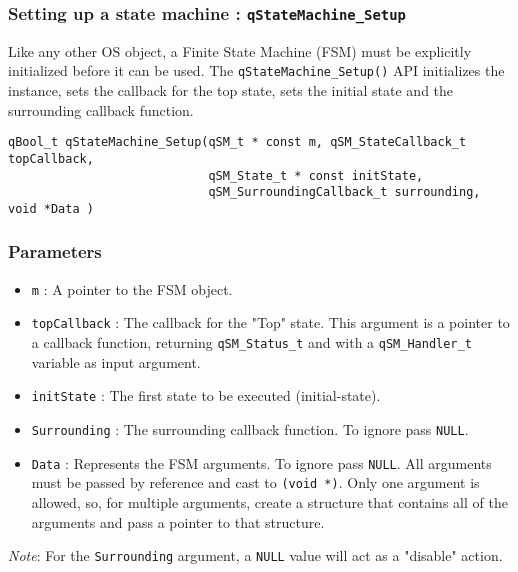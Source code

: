 \subsubsection{Setting up a state machine : \texorpdfstring{\lstinline{qStateMachine_Setup}}{qStateMachine_Setup} }
Like any other OS object, a Finite State Machine (FSM) must be explicitly initialized before it can be used. The \lstinline{qStateMachine_Setup()} API   initializes the instance, sets the callback for the top state, sets the initial state and the surrounding callback function.
\medskip

\begin{lstlisting}[style=CStyle]
qBool_t qStateMachine_Setup(qSM_t * const m, qSM_StateCallback_t topCallback, 
                            qSM_State_t * const initState, 
                            qSM_SurroundingCallback_t surrounding, void *Data )
\end{lstlisting}

\subsubsection*{Parameters}
\begin{itemize}
    \item \lstinline{m} : A pointer to the FSM object.
    \item \lstinline{topCallback} :  The callback for the "Top" state. This argument is a pointer to a callback function, returning \lstinline{qSM_Status_t} and with a \lstinline{qSM_Handler_t} variable as input argument.
    \item \lstinline{initState} : The first state to be executed (initial-state). 
    \item \lstinline{Surrounding} : The surrounding callback function. To ignore pass \lstinline{NULL}.
    \item \lstinline{Data} : Represents the FSM arguments. To ignore pass \lstinline{NULL}. All arguments must be passed by reference and cast to \lstinline{(void *)}. Only one argument is allowed, so, for multiple arguments, create a structure that contains all of the arguments and pass a pointer to that structure. 
\end{itemize}  

\begin{tcolorbox}
\ArrowBoldDownRight \textit{Note}: For the \lstinline{Surrounding} argument, a \lstinline{NULL} value will act as a "disable" action.
\end{tcolorbox}


